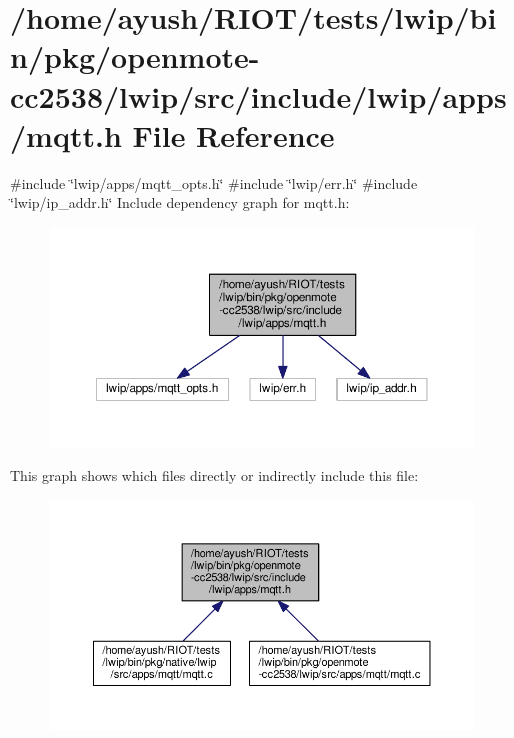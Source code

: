 \hypertarget{openmote-cc2538_2lwip_2src_2include_2lwip_2apps_2mqtt_8h}{}\section{/home/ayush/\+R\+I\+O\+T/tests/lwip/bin/pkg/openmote-\/cc2538/lwip/src/include/lwip/apps/mqtt.h File Reference}
\label{openmote-cc2538_2lwip_2src_2include_2lwip_2apps_2mqtt_8h}
{\ttfamily \#include \char`\"{}lwip/apps/mqtt\+\_\+opts.\+h\char`\"{}}\newline
{\ttfamily \#include \char`\"{}lwip/err.\+h\char`\"{}}\newline
{\ttfamily \#include \char`\"{}lwip/ip\+\_\+addr.\+h\char`\"{}}\newline
Include dependency graph for mqtt.\+h\+:
\nopagebreak
\begin{figure}[H]
\begin{center}
\leavevmode
\includegraphics[width=350pt]{openmote-cc2538_2lwip_2src_2include_2lwip_2apps_2mqtt_8h__incl}
\end{center}
\end{figure}
This graph shows which files directly or indirectly include this file\+:
\nopagebreak
\begin{figure}[H]
\begin{center}
\leavevmode
\includegraphics[width=350pt]{openmote-cc2538_2lwip_2src_2include_2lwip_2apps_2mqtt_8h__dep__incl}
\end{center}
\end{figure}
